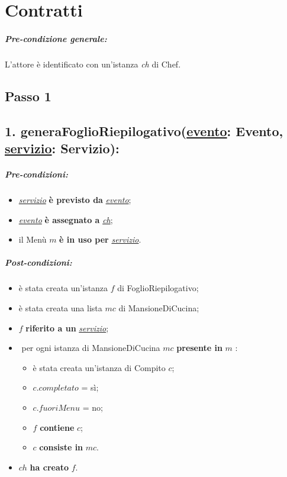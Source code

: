 \chapter{Contratti}

\paragraph{Pre-condizione generale:} L'attore è identificato con un'istanza \textit{ch} di Chef. 

\section{Passo 1}

\section*{1. generaFoglioRiepilogativo(\underline{evento}: Evento, \underline{servizio}: Servizio):}

\paragraph{Pre-condizioni:}

\begin{itemize}
  \item \underline{\textit{servizio}} \textbf{è previsto da} \underline{\textit{evento}};
  \item \underline{\textit{evento}} \textbf{è assegnato a} \underline{\textit{ch}};
  \item il Menù $m$ \textbf{è in uso per} \underline{\textit{servizio}}.
\end{itemize}

\paragraph{Post-condizioni:}

\begin{itemize}
  \item è stata creata un'istanza $f$ di FoglioRiepilogativo;
  \item è stata creata una lista $mc$ di MansioneDiCucina;
  \item $f$ \textbf{riferito a un} \underline{\textit{servizio}};
  \item \textlangle $ $ per ogni istanza di MansioneDiCucina $mc$ \textbf{presente in} $m$ \textrangle:
    \begin{itemize}
      \item è stata creata un'istanza di Compito $c$;
      \item $c.completato$ = sì;
      \item $c.fuoriMenu$ = no;
      \item $f$ \textbf{contiene} $c$;
      \item $c$ \textbf{consiste in} $mc$.
    \end{itemize}
  \item $ch$ \textbf{ha creato} $f$. 
\end{itemize}

